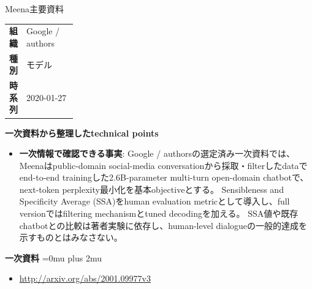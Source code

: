 \begin{technicalnote}{Meena}{主要資料}
\begingroup
\begin{tabularx}{\linewidth}{@{}>{\bfseries}p{0.22\linewidth}X@{}}
組織 & Google / authors \\
種別 & モデル \\
時系列 & 2020-01-27 \\
\end{tabularx}
\smallskip
{\bfseries 一次資料から整理したtechnical points}
\begin{itemize}[leftmargin=1.5em,itemsep=0.35em]
\item \textbf{一次情報で確認できる事実}: Google / authorsの選定済み一次資料では、Meenaはpublic-domain social-media conversationから採取・filterしたdataでend-to-end trainingした2.6B-parameter multi-turn open-domain chatbotで、next-token perplexity最小化を基本objectiveとする。 Sensibleness and Specificity Average (SSA)をhuman evaluation metricとして導入し、full versionではfiltering mechanismとtuned decodingを加える。 SSA値や既存chatbotとの比較は著者実験に依存し、human-level dialogueの一般的達成を示すものとはみなさない。
\end{itemize}
\begin{minipage}{\linewidth}
\begin{samepage}
{\bfseries 一次資料}
\begingroup\sloppy
\Urlmuskip=0mu plus 2mu\relax
\begin{itemize}[leftmargin=1.5em,itemsep=0.25em]
\item {\scriptsize\url{http://arxiv.org/abs/2001.09977v3}}
\end{itemize}
\endgroup
\end{samepage}
\end{minipage}
\endgroup
\end{technicalnote}
\medskip

